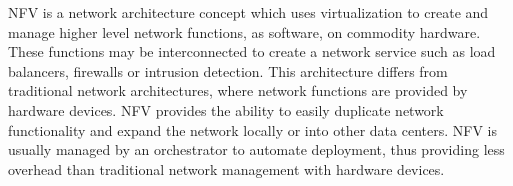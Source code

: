 NFV is a network architecture concept which uses virtualization to create and manage higher level network functions, as software, on commodity hardware. These functions may be interconnected to create a network service such as load balancers, firewalls or intrusion detection. This architecture differs from traditional network architectures, where network functions are provided by hardware devices. NFV provides the ability to easily duplicate network functionality and expand the network locally or into other data centers. NFV is usually managed by an orchestrator to automate deployment, thus providing less overhead than traditional network management with hardware devices.